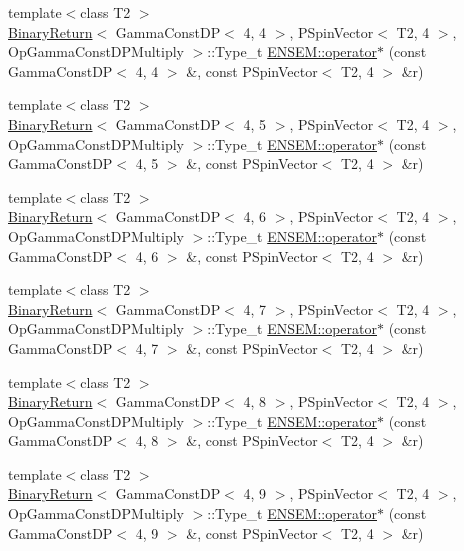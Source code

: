 \begin{DoxyCompactItemize}
\item 
{\footnotesize template$<$class T2 $>$ }\\\mbox{\hyperlink{structBinaryReturn}{Binary\+Return}}$<$ Gamma\+Const\+DP$<$ 4, 4 $>$, P\+Spin\+Vector$<$ T2, 4 $>$, Op\+Gamma\+Const\+D\+P\+Multiply $>$\+::Type\+\_\+t \mbox{\hyperlink{group__primspinvector_ga8651c7707116b78fc19958171acaabfd}{E\+N\+S\+E\+M\+::operator$\ast$}} (const Gamma\+Const\+DP$<$ 4, 4 $>$ \&, const P\+Spin\+Vector$<$ T2, 4 $>$ \&r)
\item 
{\footnotesize template$<$class T2 $>$ }\\\mbox{\hyperlink{structBinaryReturn}{Binary\+Return}}$<$ Gamma\+Const\+DP$<$ 4, 5 $>$, P\+Spin\+Vector$<$ T2, 4 $>$, Op\+Gamma\+Const\+D\+P\+Multiply $>$\+::Type\+\_\+t \mbox{\hyperlink{group__primspinvector_gaedbd65630192bc0f45ecad29cfa08152}{E\+N\+S\+E\+M\+::operator$\ast$}} (const Gamma\+Const\+DP$<$ 4, 5 $>$ \&, const P\+Spin\+Vector$<$ T2, 4 $>$ \&r)
\item 
{\footnotesize template$<$class T2 $>$ }\\\mbox{\hyperlink{structBinaryReturn}{Binary\+Return}}$<$ Gamma\+Const\+DP$<$ 4, 6 $>$, P\+Spin\+Vector$<$ T2, 4 $>$, Op\+Gamma\+Const\+D\+P\+Multiply $>$\+::Type\+\_\+t \mbox{\hyperlink{group__primspinvector_ga118f057eadddaebf7485ca26d25ad24f}{E\+N\+S\+E\+M\+::operator$\ast$}} (const Gamma\+Const\+DP$<$ 4, 6 $>$ \&, const P\+Spin\+Vector$<$ T2, 4 $>$ \&r)
\item 
{\footnotesize template$<$class T2 $>$ }\\\mbox{\hyperlink{structBinaryReturn}{Binary\+Return}}$<$ Gamma\+Const\+DP$<$ 4, 7 $>$, P\+Spin\+Vector$<$ T2, 4 $>$, Op\+Gamma\+Const\+D\+P\+Multiply $>$\+::Type\+\_\+t \mbox{\hyperlink{group__primspinvector_ga06f03963e659581745493e56edf21491}{E\+N\+S\+E\+M\+::operator$\ast$}} (const Gamma\+Const\+DP$<$ 4, 7 $>$ \&, const P\+Spin\+Vector$<$ T2, 4 $>$ \&r)
\item 
{\footnotesize template$<$class T2 $>$ }\\\mbox{\hyperlink{structBinaryReturn}{Binary\+Return}}$<$ Gamma\+Const\+DP$<$ 4, 8 $>$, P\+Spin\+Vector$<$ T2, 4 $>$, Op\+Gamma\+Const\+D\+P\+Multiply $>$\+::Type\+\_\+t \mbox{\hyperlink{group__primspinvector_gaf50876f75a5b7bb882a7346408b4a90c}{E\+N\+S\+E\+M\+::operator$\ast$}} (const Gamma\+Const\+DP$<$ 4, 8 $>$ \&, const P\+Spin\+Vector$<$ T2, 4 $>$ \&r)
\item 
{\footnotesize template$<$class T2 $>$ }\\\mbox{\hyperlink{structBinaryReturn}{Binary\+Return}}$<$ Gamma\+Const\+DP$<$ 4, 9 $>$, P\+Spin\+Vector$<$ T2, 4 $>$, Op\+Gamma\+Const\+D\+P\+Multiply $>$\+::Type\+\_\+t \mbox{\hyperlink{group__primspinvector_ga39c7d40232a2f254a4b3903a51cb61db}{E\+N\+S\+E\+M\+::operator$\ast$}} (const Gamma\+Const\+DP$<$ 4, 9 $>$ \&, const P\+Spin\+Vector$<$ T2, 4 $>$ \&r)

\end{DoxyCompactItemize}
